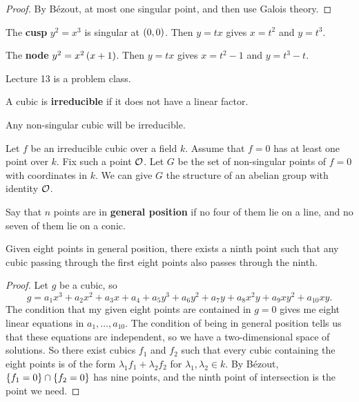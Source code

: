 \begin{proof}
By B\'ezout, at most one singular point, and then use Galois theory.
\end{proof}

\begin{example}
\label{eg:6.5}
The \textbf{cusp} $ y^2 = x^3 $ is singular at $ \br{0, 0} $. Then $ y = tx $ gives $ x = t^2 $ and $ y = t^3 $.
\end{example}

\begin{example}
The \textbf{node} $ y^2 = x^2\br{x + 1} $. Then $ y = tx $ gives $ x = t^2 - 1 $ and $ y = t^3 - t $.
\end{example}


Lecture 13 is a problem class.

\pagebreak


A cubic is \textbf{irreducible} if it does not have a linear factor.

\begin{example*}
Any non-singular cubic will be irreducible.
\end{example*}

\begin{theorem}
\label{thm:6.7}
Let $ f $ be an irreducible cubic over a field $ k $. Assume that $ f = 0 $ has at least one point over $ k $. Fix such a point $ \mathcal{O} $. Let $ G $ be the set of non-singular points of $ f = 0 $ with coordinates in $ k $. We can give $ G $ the structure of an abelian group with identity $ \mathcal{O} $.
\end{theorem}

Say that $ n $ points are in \textbf{general position} if no four of them lie on a line, and no seven of them lie on a conic.

\begin{lemma}
\label{lem:6.8}
Given eight points in general position, there exists a ninth point such that any cubic passing through the first eight points also passes through the ninth.
\end{lemma}

\begin{proof}
Let $ g $ be a cubic, so
$$ g = a_1x^3 + a_2x^2 + a_3x + a_4 + a_5y^3 + a_6y^2 + a_7y + a_8x^2y + a_9xy^2 + a_{10}xy. $$
The condition that my given eight points are contained in $ g = 0 $ gives me eight linear equations in $ a_1, \dots, a_{10} $. The condition of being in general position tells us that these equations are independent, so we have a two-dimensional space of solutions. So there exist cubics $ f_1 $ and $ f_2 $ such that every cubic containing the eight points is of the form $ \lambda_1f_1 + \lambda_2f_2 $ for $ \lambda_1, \lambda_2 \in k $. By B\'ezout, $ \cbr{f_1 = 0} \cap \cbr{f_2 = 0} $ has nine points, and the ninth point of intersection is the point we need.
\end{proof}

